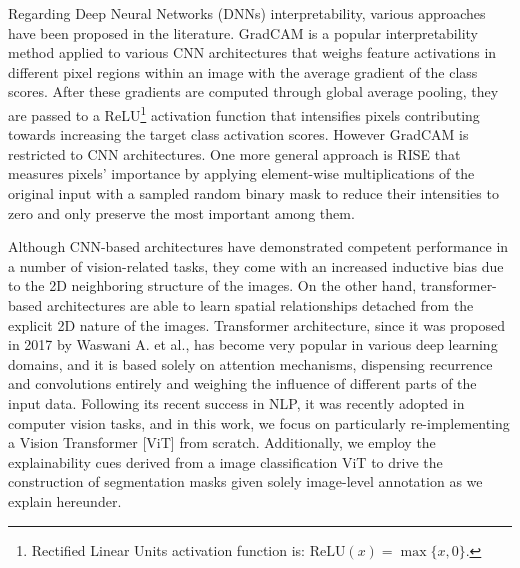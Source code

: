 \documentclass{article}
\begin{document}
Regarding Deep Neural Networks (DNNs) interpretability, various approaches have been proposed in the literature. GradCAM \cite{selvaraju2017grad} is a popular interpretability method applied to various CNN architectures that weighs feature activations in different pixel regions within an image with the average gradient of the class scores. After these gradients are computed through global average pooling, they are passed to a ReLU\footnote{Rectified Linear Units activation function is: $\text{ReLU}(x) = \max\{x,0\}$.} activation function that intensifies pixels contributing towards increasing the target class activation scores. However GradCAM is restricted to CNN architectures. One more general approach is RISE \cite{rise} that measures pixels' importance by applying element-wise multiplications of the original input with a sampled random binary mask to reduce their intensities to zero and only preserve the most important among them. 

Although CNN-based architectures have demonstrated competent performance in a number of vision-related tasks, they come with an increased inductive bias due to the 2D neighboring structure of the images. On the other hand, transformer-based architectures are able to learn spatial relationships detached from the explicit 2D nature of the images. Transformer architecture, since it was proposed in 2017 by Waswani A. et al., \cite{vaswani2017attention} has become very popular in various deep learning domains, and it is based solely on attention mechanisms, dispensing recurrence and convolutions entirely and weighing the influence of different parts of the input data. Following its recent success in NLP, it was recently adopted in computer vision tasks, and in this work, we focus on particularly re-implementing a Vision Transformer [ViT] \cite{visiontransformer} from scratch. Additionally, we employ the explainability cues derived from a image classification ViT to drive the construction of segmentation masks given solely image-level annotation as we explain hereunder.

\end{document}
